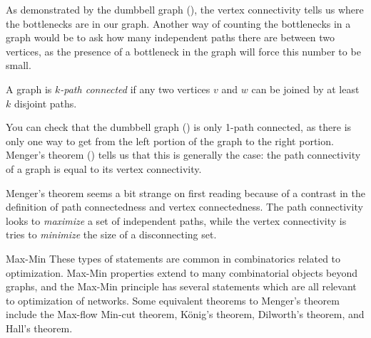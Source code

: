 As demonstrated by the dumbbell graph (), the vertex connectivity tells us where the bottlenecks are in our graph. 
Another way of counting the bottlenecks in a graph would be to ask how many independent paths there are between two vertices, as the presence of a bottleneck in the graph will force this number to be small.
\begin{definition} 
	A graph is \emph{$k$-path connected} if any two vertices $v$ and $w$ can be joined by at least $k$ disjoint paths. 
\end{definition}
You can check that  the dumbbell graph () is only 1-path connected, as there is only one way to get from the left portion of the graph to the right portion. Menger's theorem () tells us that this is generally the case: the path connectivity of a graph is equal to its vertex connectivity.

Menger's theorem seems a bit strange on first reading because of a contrast in the definition of path connectedness and vertex connectedness. 
The path connectivity looks to  \emph{maximize} a set of independent paths, while the vertex connectivity is tries to  \emph{minimize} the size of a disconnecting set.

\begin{projectdescription}{Max-Min}
These types of statements are common in combinatorics related to optimization.
Max-Min properties extend to many combinatorial  \label{proj:maxmin}  objects beyond graphs,  and the Max-Min principle has several statements which are all relevant to optimization of networks.  Some equivalent theorems to Menger's theorem include the Max-flow Min-cut theorem, K\"onig's theorem, Dilworth's theorem, and Hall's theorem.
\end{projectdescription}


